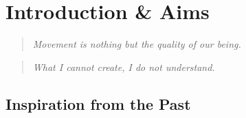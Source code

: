 \documentclass[../main.tex]{subfiles}
\begin{document}
\chapter{Introduction \& Aims}\label{chap:intro}

\bigskip
\begin{quote}
  \emph{Movement is nothing but the quality of our being.}
  
\end{quote}

\bigskip
\begin{quote}
  \emph{What I cannot create, I do not understand.}
  
\end{quote}

\cleardoublepage%








\section{Inspiration from the Past}
\end{document}
